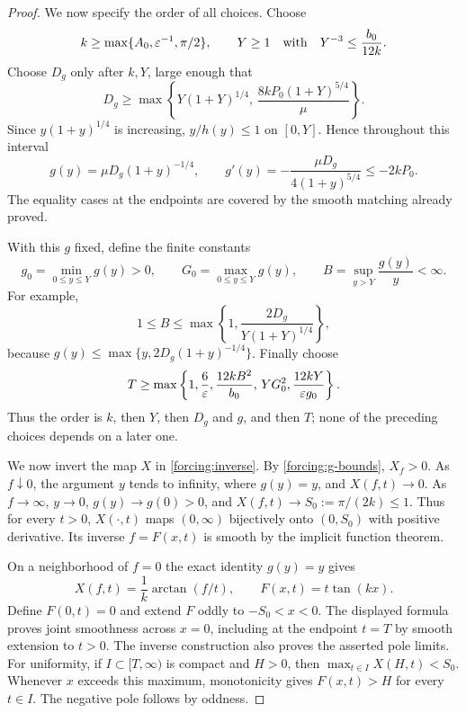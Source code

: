 \begin{proof}
We now specify the order of all choices.  Choose
\begin{equation}\label{forcing:k-Y}
 k\ge\max\{A_0,\varepsilon^{-1},\pi/2\},\qquad
 Y\ge1\quad\text{with}\quad Y^{-3}\le\frac{b_0}{12k}.
\end{equation}
Choose $D_g$ only after $k,Y$, large enough that
\begin{equation}\label{forcing:D-choice}
 D_g\ge\max\left\{
 Y(1+Y)^{1/4},\,
 \frac{8kP_0(1+Y)^{5/4}}{\mu}
 \right\}.
\end{equation}
Since $y(1+y)^{1/4}$ is increasing, $y/h(y)\le1$ on $[0,Y]$.
Hence throughout this interval
\begin{equation}\label{forcing:decreasing-range}
 g(y)=\mu D_g(1+y)^{-1/4},\qquad
 g'(y)=-\frac{\mu D_g}{4(1+y)^{5/4}}\le-2kP_0.
\end{equation}
The equality cases at the endpoints are covered by the smooth matching
already proved.

With this $g$ fixed, define the finite constants
\[
 g_0=\min_{0\le y\le Y}g(y)>0,\qquad
 G_0=\max_{0\le y\le Y}g(y),\qquad
 B=\sup_{y>Y}\frac{g(y)}y<\infty.
\]
For example,
\[
 1\le B\le\max\left\{1,\frac{2D_g}{Y(1+Y)^{1/4}}\right\},
\]
because $g(y)\le\max\{y,2D_g(1+y)^{-1/4}\}$.
Finally choose
\begin{equation}\label{forcing:T-choice}
 T\ge\max\left\{
 1,\frac6{\varepsilon},\frac{12kB^2}{b_0},\,
 YG_0^2,\frac{12kY}{\varepsilon g_0}
 \right\}.
\end{equation}
Thus the order is $k$, then $Y$, then $D_g$ and $g$, and then $T$;
none of the preceding choices depends on a later one.

We now invert the map $X$ in \cref{forcing:inverse}.
By \cref{forcing:g-bounds}, $X_f>0$.  As $f\downarrow0$, the argument
$y$ tends to infinity, where $g(y)=y$, and $X(f,t)\to0$.  As
$f\to\infty$, $y\to0$, $g(y)\to g(0)>0$, and
$X(f,t)\to S_0:=\pi/(2k)\le1$.  Thus for every $t>0$, $X(\cdot,t)$
maps $(0,\infty)$ bijectively onto $(0,S_0)$ with positive derivative.
Its inverse $f=F(x,t)$ is smooth by the implicit function theorem.

On a neighborhood of $f=0$ the exact identity $g(y)=y$ gives
\[
 X(f,t)=\frac1k\arctan(f/t),\qquad F(x,t)=t\tan(kx).
\]
Define $F(0,t)=0$ and extend $F$ oddly to $-S_0<x<0$.  The displayed
formula proves joint smoothness across $x=0$, including at the endpoint
$t=T$ by smooth extension to $t>0$.  The inverse construction also
proves the asserted pole limits.  For uniformity, if $I\subset[T,\infty)$
is compact and $H>0$, then $\max_{t\in I}X(H,t)<S_0$.  Whenever $x$
exceeds this maximum, monotonicity gives $F(x,t)>H$ for every $t\in I$.
The negative pole follows by oddness.


\end{proof}
